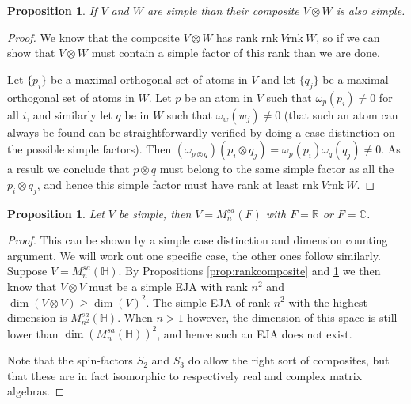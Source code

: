 \documentclass[a4paper,onecolumn,10pt,accepted=2019-05-03, issue=1, volume=1, shorttitle=papers/compositionality-1-1]{compositionalityarticle}
\newcounter{counter}
\numberwithin{counter}{section}
\newtheorem{proposition}[counter]{Proposition}
\newcommand{\rnk}{\text{rnk}\xspace}
\newcommand{\R}{\mathbb{R}}
\newcommand{\C}{\mathbb{C}}
\begin{document}
\begin{proposition}\label{prop:simplecomposite}
    If $V$ and $W$ are simple than their composite $V\otimes W$ is also simple.
\end{proposition}
\begin{proof}
    We know that the composite $V\otimes W$ has rank $\rnk~V \rnk~W$, so if we can show that $V\otimes W$ must contain a simple factor of this rank than we are done.

    Let $\{p_i\}$ be a maximal orthogonal set of atoms in $V$ and let $\{q_j\}$ be a maximal orthogonal set of atoms in $W$. Let $p$ be an atom in $V$ such that $\omega_p(p_i) \neq 0$ for all $i$, and similarly let $q$ be in $W$ such that $\omega_w(w_j) \neq 0$ (that such an atom can always be found can be straightforwardly verified by doing a case distinction on the possible simple factors). Then $(\omega_{p\otimes q})(p_i\otimes q_j) = \omega_p(p_i)\omega_q(q_j) \neq 0$. As a result we conclude that $p\otimes q$ must belong to the same simple factor as all the $p_i\otimes q_j$, and hence this simple factor must have rank at least $\rnk~V \rnk~W$.
\end{proof}

\begin{proposition}\label{prop:simpleEJAcomplexreal}
    Let $V$ be simple, then $V=M_n^{sa}(F)$ with $F=\R$ or $F=\C$.
\end{proposition}
\begin{proof}
    This can be shown by a simple case distinction and dimension counting argument. We will work out one specific case, the other ones follow similarly. Suppose $V=M_n^{sa}(\mathbb{H})$. By Propositions \ref{prop:rankcomposite} and \ref{prop:simplecomposite} we then know that $V\otimes V$ must be a simple EJA with rank $n^2$ and $\dim(V\otimes V)\geq \dim(V)^2$. The simple EJA of rank $n^2$ with the highest dimension is $M_{n^2}^{sa}(\mathbb{H})$. When $n>1$ however, the dimension of this space is still lower than $\dim(M_n^{sa}(\mathbb{H}))^2$, and hence such an EJA does not exist.

    Note that the spin-factors $S_2$ and $S_3$ do allow the right sort of composites, but that these are in fact isomorphic to respectively real and complex matrix algebras.
\end{proof}
\end{document}
